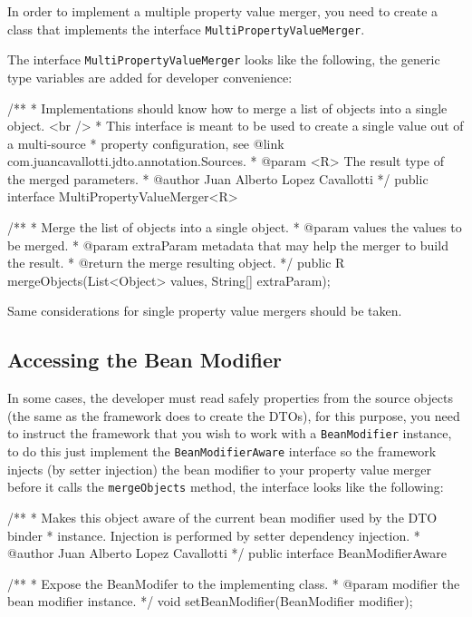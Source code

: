 \documentclass[11pt]{article}
\begin{document}
In order to implement a multiple property value merger, you need to create a class that implements the interface \texttt{MultiPropertyValueMerger}.

The interface \texttt{MultiPropertyValueMerger} looks like the following, the generic type variables are added for developer convenience:

\begin{java}
/**
 * Implementations should know how to merge a list of objects into a single object. <br />
 * This interface is meant to be used to create a single value out of a multi-source
 * property configuration, see {@link com.juancavallotti.jdto.annotation.Sources}.
 * @param <R> The result type of the merged parameters.
 * @author Juan Alberto Lopez Cavallotti
 */
public interface MultiPropertyValueMerger<R> {
    
    /**
     * Merge the list of objects into a single object.
     * @param values the values to be merged.
     * @param extraParam metadata that may help the merger to build the result.
     * @return the merge resulting object.
     */
    public R mergeObjects(List<Object> values, String[] extraParam);
}
\end{java}

Same considerations for single property value mergers should be taken.

\subsection{Accessing the Bean Modifier}

In some cases, the developer must read safely properties from the source objects (the same as the framework does to create the DTOs), for this purpose, you need to instruct the framework that you wish to work with a \texttt{BeanModifier} instance, to do this just implement the \texttt{BeanModifierAware} interface so the framework injects (by setter injection) the bean modifier to your property value merger before it calls the \texttt{mergeObjects} method, the interface looks like the following:

\begin{java}
/**
 * Makes this object aware of the current bean modifier used by the DTO binder
 * instance. Injection is performed by setter dependency injection.
 * @author Juan Alberto Lopez Cavallotti
 */
public interface BeanModifierAware {
    
    /**
     * Expose the BeanModifer to the implementing class.
     * @param modifier the bean modifier instance.
     */
    void setBeanModifier(BeanModifier modifier);
}
\end{java}
\end{document}
